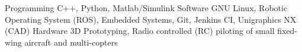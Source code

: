 

\begin{cvskills}

\vspace{-4pt}
  \cvskill
    {Programming} %
    {C++, Python, Matlab/Simulink} %
    \vspace{-4pt}
  \cvskill
    {Software} %
    {GNU Linux, Robotic Operating System (ROS), Embedded Systems, Git, Jenkins CI, Unigraphics NX (CAD)} %
    \vspace{-4pt}
  \cvskill
    {Hardware}
    {3D Prototyping, Radio controlled (RC) piloting of small fixed-wing aircraft and multi-copters}


\end{cvskills}
